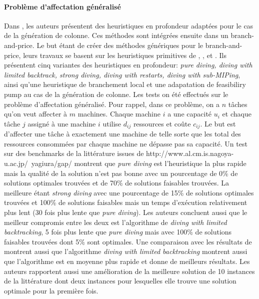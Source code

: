 \documentclass[12pt,a4paper,oneside]{book}
\theoremstyle{definition}
\begin{document}
	    \paragraph{Problème d'affectation généralisé}
	        Dans \cite{sadykov2018primal}, les auteurs présentent des heuristiques en profondeur adaptées pour le cas de la génération de colonne. Ces méthodes sont intégrées ensuite dans un branch-and-price. Le but étant de créer des méthodes génériques pour le branch-and-price, leurs travaux se basent sur les heuristiques primitives de \cite{fischetti2003local}, \cite{Fischetti2005}, \cite{danna2005exploring} et \cite{berthold2006}.
	        Ils présentent cinq variantes des heuristiques en profondeur: \textit{pure diving, diving with limited backtrack, strong diving, diving with restarts, diving with sub-MIPing}, ainsi qu'une heuristique de branchement local et une adapatation de feasibiliry pump au cas de la génération de colonne. Les tests on été effectués sur le problème d'affectation généralisé. Pour rappel, dans ce problème, on a $n$ tâches qu'on veut affecter à $m$ machines. Chaque machine $i$ a une capacité $u_i$ et chaque tâche $j$ assigné à une machine $i$ utilise $d_{ij}$ ressources et coûte $c_{ij}$. Le but est d'affecter une tâche à exactement une machine de telle sorte que les total des ressources consommées par chaque machine ne dépasse pas sa capacité. Un test sur des benchmarks de la littérature issues de http://www.al.cm.is.nagoya-u.ac.jp/~yagiura/gap/ montrent que \textit{pure diving} est l'heuristique la plus rapide mais la qualité de la solution n'est pas bonne avec un pourcentage de 0\% de solutions optimales trouvées et de 70\% de solutions faisables trouvées. La meilleure étant \textit{strong diving} avec une pourcentage de 15\% de solutions optimales trouvées et 100\% de solutions faisables mais un temps d'exécution relativement plus lent (30 fois plus lente que \textit{pure diving}). Les auteurs concluent aussi que le meilleur compromis entre les deux est l'algorithme de \textit{diving with limited backtracking}, 5 fois plus lente que \textit{pure diving} mais avec 100\% de solutions faisables trouvées dont 5\% sont optimales. Une comparaison avec les résultats de \cite{Yagiura2006} montrent aussi que l'algorithme \textit{diving with limited backtracking} montrent aussi que l'algorithme est en moyenne plus rapide et donne de meilleurs résultats. Les auteurs rapportent aussi une amélioration de la meilleure solution de 10 instances de la littérature dont deux instances pour lesquelles elle trouve une solution optimale pour la première fois. 
	        
\end{document}
